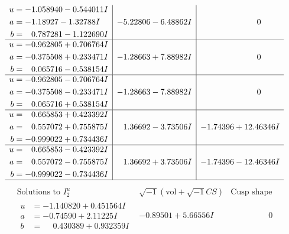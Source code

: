 \documentclass[1p]{elsarticle_modified}
\theoremstyle{definition}
\newcommand{\I}{\sqrt{-1}}
\begin{document}
$$\begin{array}{c|c|c}
\begin{aligned}
u &= -1.058940 - 0.544011 I \\
a &= -1.18927 - 1.32788 I \\
b &= \phantom{-}0.787281 - 1.122690 I\end{aligned}
 & -5.22806 - 6.48862 I & \phantom{-0.000000 } 0 \\ \hline\begin{aligned}
u &= -0.962805 + 0.706764 I \\
a &= -0.375508 + 0.233471 I \\
b &= \phantom{-}0.065716 - 0.538154 I\end{aligned}
 & -1.28663 + 7.88982 I & \phantom{-0.000000 } 0 \\ \hline\begin{aligned}
u &= -0.962805 - 0.706764 I \\
a &= -0.375508 - 0.233471 I \\
b &= \phantom{-}0.065716 + 0.538154 I\end{aligned}
 & -1.28663 - 7.88982 I & \phantom{-0.000000 } 0 \\ \hline\begin{aligned}
u &= \phantom{-}0.665853 + 0.423392 I \\
a &= \phantom{-}0.557072 + 0.755875 I \\
b &= -0.999022 + 0.734436 I\end{aligned}
 & \phantom{-}1.36692 - 3.73506 I & -1.74396 + 12.46346 I \\ \hline\begin{aligned}
u &= \phantom{-}0.665853 - 0.423392 I \\
a &= \phantom{-}0.557072 - 0.755875 I \\
b &= -0.999022 - 0.734436 I\end{aligned}
 & \phantom{-}1.36692 + 3.73506 I & -1.74396 - 12.46346 I\\
 \hline 
 \end{array}$$\newpage$$\begin{array}{c|c|c}  
\text{Solutions to }I^u_{2}& \I (\text{vol} + \sqrt{-1}CS) & \text{Cusp shape}\\
 \hline 
\begin{aligned}
u &= -1.140820 + 0.451564 I \\
a &= -0.74590 + 2.11225 I \\
b &= \phantom{-}0.430389 + 0.932359 I\end{aligned}
 & -0.89501 + 5.66556 I & \phantom{-0.000000 } 0 \\ \hline\begin{aligned}

\end{aligned}
\end{array}$$
\end{document}
